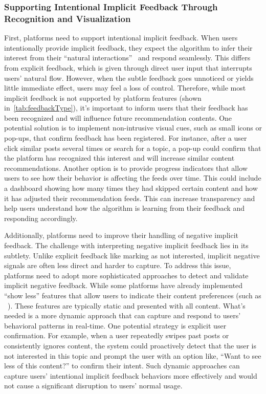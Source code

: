 \subsubsection{Supporting Intentional Implicit Feedback Through Recognition and Visualization} 
First, platforms need to support intentional implicit feedback. When users intentionally provide implicit feedback, they expect the algorithm to infer their interest from their ``natural interactions''~\cite{kelly2003implicit} and respond seamlessly. This differs from explicit feedback, which is given through direct user input that interrupts users' natural flow. However, when the subtle feedback goes unnoticed or yields little immediate effect, users may feel a loss of control. Therefore, while most implicit feedback is not supported by platform features (shown in~\autoref{tab:feedbackType}), it's important to inform users that their feedback has been recognized and will influence future recommendation contents. One potential solution is to implement non-intrusive visual cues, such as small icons or pop-ups, that confirm feedback has been registered. For instance, after a user click similar posts several times or search for a topic, a pop-up could confirm that the platform has recognized this interest and will increase similar content recommendations. Another option is to provide progress indicators that allow users to see how their behavior is affecting the feeds over time. This could include a dashboard showing how many times they had skipped certain content and how it has adjusted their recommendation feeds. This can increase transparency and help users understand how the algorithm is learning from their feedback and responding accordingly. 

Additionally, platforms need to improve their handling of negative implicit feedback. The challenge with interpreting negative implicit feedback lies in its subtlety. Unlike explicit feedback like marking as not interested, implicit negative signals are often less direct and harder to capture. To address this issue, platforms need to adopt more sophisticated approaches to detect and validate implicit negative feedback. While some platforms have already implemented ``show less'' features that allow users to indicate their content preferences (such as ~\cite{meta_new_2022}). These features are typically static and presented with all content. What's needed is a more dynamic approach that can capture and respond to users' behavioral patterns in real-time. One potential strategy is explicit user confirmation. For example, when a user repeatedly swipes past posts or consistently ignores content, the system could proactively detect that the user is not interested in this topic and prompt the user with an option like, ``Want to see less of this content?'' to confirm their intent. Such dynamic approaches can capture users' intentional implicit feedback behaviors more effectively and would not cause a significant disruption to users' normal usage.

